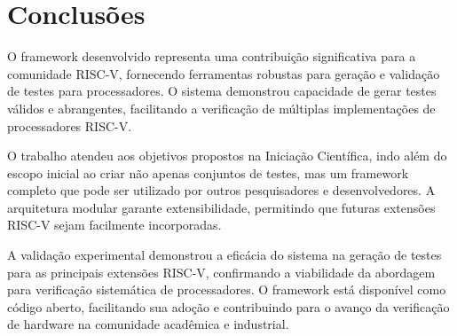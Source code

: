 \documentclass[12pt,a4paper]{article}
\begin{document}
\section{Conclusões}

O framework desenvolvido representa uma contribuição significativa para a comunidade RISC-V, fornecendo ferramentas robustas para geração e validação de testes para processadores. O sistema demonstrou capacidade de gerar testes válidos e abrangentes, facilitando a verificação de múltiplas implementações de processadores RISC-V.

O trabalho atendeu aos objetivos propostos na Iniciação Científica, indo além do escopo inicial ao criar não apenas conjuntos de testes, mas um framework completo que pode ser utilizado por outros pesquisadores e desenvolvedores. A arquitetura modular garante extensibilidade, permitindo que futuras extensões RISC-V sejam facilmente incorporadas.

A validação experimental demonstrou a eficácia do sistema na geração de testes para as principais extensões RISC-V, confirmando a viabilidade da abordagem para verificação sistemática de processadores. O framework está disponível como código aberto, facilitando sua adoção e contribuindo para o avanço da verificação de hardware na comunidade acadêmica e industrial.
\end{document}
